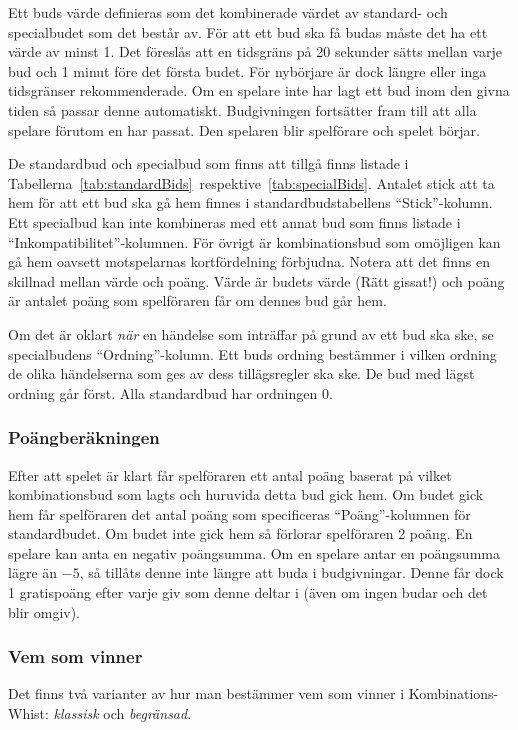 \documentclass[a4paper]{article}
\begin{document}
				Ett buds värde definieras som det kombinerade värdet av standard- och specialbudet som det består av. För att ett bud ska få budas måste det ha ett värde av minst 1. Det föreslås att en tidsgräns på 20 sekunder sätts mellan varje bud och 1 minut före det första budet. För nybörjare är dock längre eller inga tidsgränser rekommenderade. Om en spelare inte har lagt ett bud inom den givna tiden så passar denne automatiskt. Budgivningen fortsätter fram till att alla spelare förutom en har passat. Den spelaren blir spelförare och spelet börjar.

				De standardbud och specialbud som finns att tillgå finns listade i Tabellerna~\ref{tab:standardBids}~respektive~\ref{tab:specialBids}. Antalet stick att ta hem för att ett bud ska gå hem finnes i standardbudstabellens ``Stick''-kolumn. Ett specialbud kan inte kombineras med ett annat bud som finns listade i ``Inkompatibilitet''-kolumnen. För övrigt är kombinationsbud som omöjligen kan gå hem oavsett motspelarnas kortfördelning förbjudna. Notera att det finns en skillnad mellan värde och poäng. Värde är budets värde (Rätt gissat!) och poäng är antalet poäng som spelföraren får om dennes bud går hem.

				Om det är oklart \emph{när} en händelse som inträffar på grund av ett bud ska ske, se specialbudens ``Ordning''-kolumn. Ett buds ordning bestämmer i vilken ordning de olika händelserna som ges av dess tillägsregler ska ske. De bud med lägst ordning går först. Alla standardbud har ordningen 0.

			\subsubsection{Poängberäkningen}
				Efter att spelet är klart får spelföraren ett antal poäng baserat på vilket kombinationsbud som lagts och huruvida detta bud gick hem. Om budet gick hem får spelföraren det antal poäng som specificeras ``Poäng''-kolumnen för standardbudet. Om budet inte gick hem så förlorar spelföraren 2 poäng. En spelare kan anta en negativ poängsumma. Om en spelare antar en poängsumma lägre än $-5$, så tillåts denne inte längre att buda i budgivningar. Denne får dock 1 gratispoäng efter varje giv som denne deltar i (även om ingen budar och det blir omgiv).

			\subsubsection{Vem som vinner}
				\label{sec:winning}
				Det finns två varianter av hur man bestämmer vem som vinner i Kombinations-Whist: \emph{klassisk} och \emph{begränsad}.
\end{document}
